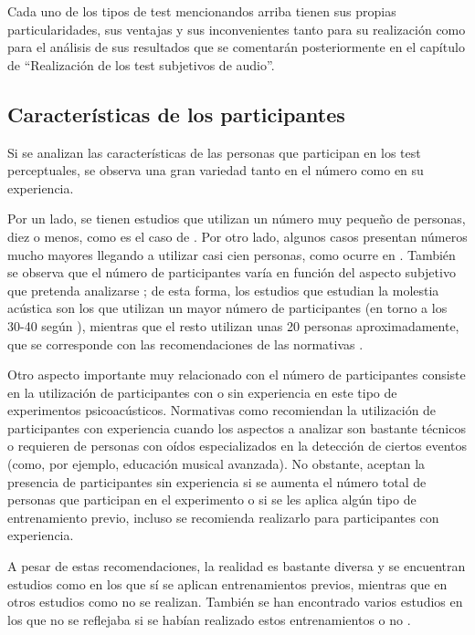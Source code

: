\documentclass[11pt,a4paper]{book}
\begin{document}
    		Cada uno de los tipos de test mencionandos arriba tienen sus propias particularidades, sus ventajas y sus inconvenientes tanto para su realización como para el análisis de sus resultados que se comentarán posteriormente en el capítulo de ``Realización de los test subjetivos de audio''.
    
	    \subsection{Características de los participantes}
    		Si se analizan las características de las personas que participan en los test perceptuales, se observa una gran variedad tanto en el número como en su experiencia. 
    		
    		Por un lado, se tienen estudios que utilizan un número muy pequeño de personas, diez o menos, como es el caso de \cite{2019MNowak, 2002PZahorik, 2016SKlockgether,2019ZShao}. Por otro lado, algunos casos presentan números mucho mayores llegando a utilizar casi cien personas, como ocurre en \cite{1954JEgan}. También se observa que el número de participantes varía en función del aspecto subjetivo que pretenda analizarse \cite{Tejada2020}; de esta forma, los estudios que estudian la molestia acústica son los que utilizan un mayor número de participantes (en torno a los 30-40 según \cite{Tejada2020}), mientras que el resto utilizan unas 20 personas aproximadamente, que se corresponde con las recomendaciones de las normativas \cite{UIT1116, UIT1284, UIT1534}.

            Otro aspecto importante muy relacionado con el número de participantes consiste en la utilización de participantes con o sin experiencia en este tipo de experimentos psicoacústicos. Normativas como \cite{UIT1116, UIT1284, UIT1534} recomiendan la utilización de participantes con experiencia cuando los aspectos a analizar son bastante técnicos o requieren de personas con oídos especializados en la detección de ciertos eventos (como, por ejemplo, educación musical avanzada). No obstante, aceptan la presencia de participantes sin experiencia si se aumenta el número total de personas que participan en el experimento o si se les aplica algún tipo de entrenamiento previo, incluso se recomienda realizarlo para participantes con experiencia.

            A pesar de estas recomendaciones, la realidad es bastante diversa y se encuentran estudios como \cite{1995GASoulodre,1999JBradley, 2005IWitew, 2010FMartellotta, 2010MVigeant, 1997SCarlile, 2011VEmiya, 2016BPostma, 2019ZShao, 2019VRajala, 2019MShiell, 2019JGroose, Braun2004, delaPrida2019, delaPrida2021} en los que sí se aplican entrenamientos previos, mientras que en otros estudios como \cite{Brockhoff2009,2019LKritly,2019DMorikawa, 2019DJSchlit} no se realizan. También se han encontrado varios estudios en los que no se reflejaba si se habían realizado estos entrenamientos o no \cite{2002PZahorik, 2016SKlockgether, 2019GPulvirenti,2019MNowak, 2019MYamada, 2019JLee, Christensen2009}.
    
\end{document}

